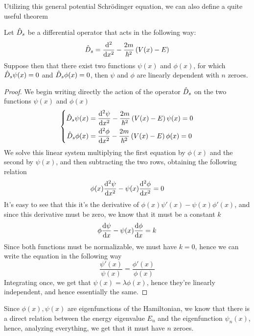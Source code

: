 \documentclass[../qm.tex]{subfiles}
\begin{document}
	Utilizing this general potential Schrödinger equation, we can also define a quite useful theorem
	\begin{thm}
		Let $\hat{D}_s$ be a differential operator that acts in the following way:
		\begin{equation*}
			\opr{D}_s=\derivative[2]{x}-\frac{2m}{\hbar^2}\left( V(x)-E \right)
		\end{equation*}
		Suppose then that there exist two functions $\psi(x)$ and $\phi(x)$, for which $\hat{D}_s\psi(x)=0$ and $\hat{D}_s\phi(x)=0$, then $\psi$ and $\phi$ are linearly dependent with $n$ zeroes.
	\end{thm}
	\begin{proof}
		We begin writing directly the action of the operator $\hat{D}_s$ on the two functions $\psi(x)$ and $\phi(x)$
		\begin{equation*}
			\left\{ \begin{aligned}
					\opr{D}_s\psi(x)&=\derivative[2]{\psi}{x}-\frac{2m}{\hbar^2}\left( V(x)-E \right)\psi(x)=0\\
					\opr{D}_s\phi(x)&=\derivative[2]{\phi}{x}-\frac{2m}{\hbar^2}\left( V(x)-E \right)\phi(x)=0
			\end{aligned}\right.
		\end{equation*}
		We solve this linear system multiplying the first equation by $\phi(x)$ and the second by $\psi(x)$, and then subtracting the two rows, obtaining the following relation
		\begin{equation*}
			\phi(x)\derivative[2]{\psi}{x}-\psi(x)\derivative[2]{\phi}{x}=0
		\end{equation*}
		It's easy to see that this it's the derivative of $\phi(x)\psi'(x)-\psi(x)\phi'(x)$, and since this derivative must be zero, we know that it must be a constant $k$
		\begin{equation*}
			\phi\derivative{\psi}{x}-\psi(x)\derivative{\phi}{x}=k
		\end{equation*}
		Since both functions must be normalizable, we must have $k=0$, hence we can write the equation in the following way
		\begin{equation*}
			\frac{\psi'(x)}{\psi(x)}=\frac{\phi'(x)}{\phi(x)}
		\end{equation*}
		Integrating once, we get that $\psi(x)=\lambda\phi(x)$, hence they're linearly independent, and hence essentially the same.
	\end{proof}
	\begin{cor}
		Since $\phi(x),\psi(x)$ are eigenfunctions of the Hamiltonian, we know that there is a direct relation between the energy eigenvalue $E_n$ and the eigenfunction $\psi_{n}(x)$, hence, analyzing everything, we get that it must have $n$ zeroes.
	\end{cor}
\end{document}
